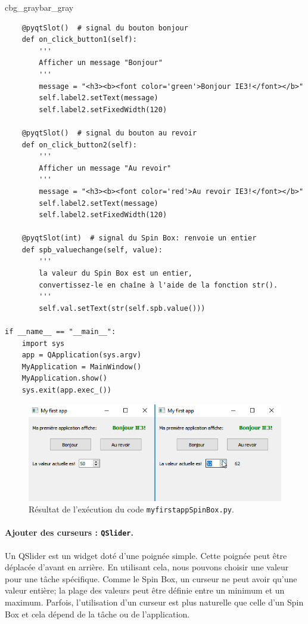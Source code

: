 \documentclass[%
oneside,                 %
final,                   %
10pt,french]{article}
\newenvironment{_pro_tight}[2]{
   \def\FrameCommand{\color{#2}\vrule width 1mm\normalcolor\colorbox{#1}}
   \FrameRule0.6pt\MakeFramed {\advance\hsize-2mm\FrameRestore}\vskip3mm}
   {\vskip0mm\endMakeFramed}
\newenvironment{pro}[2]{
\bgroup\rmfamily
\fboxsep=0mm\relax
\begin{_pro_tight}{#1}{#2}
\list{}{\parsep=-2mm\parskip=0mm\topsep=0pt\leftmargin=2mm
\rightmargin=2\leftmargin\leftmargin=4pt\relax}
\item\relax}
{\endlist\end{_pro_tight}\egroup}
\begin{document}
\begin{pro}{cbg_gray}{bar_gray}
\begin{verbatim}
    @pyqtSlot()  # signal du bouton bonjour
    def on_click_button1(self):
        '''
        Afficher un message "Bonjour"
        '''
        message = "<h3><b><font color='green'>Bonjour IE3!</font></b>"
        self.label2.setText(message)
        self.label2.setFixedWidth(120)

    @pyqtSlot()  # signal du bouton au revoir
    def on_click_button2(self):
        '''
        Afficher un message "Au revoir"
        '''
        message = "<h3><b><font color='red'>Au revoir IE3!</font></b>"
        self.label2.setText(message)
        self.label2.setFixedWidth(120)

    @pyqtSlot(int)  # signal du Spin Box: renvoie un entier
    def spb_valuechange(self, value):
        '''
        la valeur du Spin Box est un entier,
        convertissez-le en chaîne à l'aide de la fonction str().
        '''
        self.val.setText(str(self.spb.value()))

if __name__ == "__main__":
    import sys
    app = QApplication(sys.argv)
    MyApplication = MainWindow()
    MyApplication.show()
    sys.exit(app.exec_())
\end{verbatim}
\end{pro}
\noindent


\begin{figure}[!ht]  %
  \centerline{\includegraphics[width=0.4\linewidth]{imgs/myfirstappSpinBox.png}}
  \caption{
  Résultat de l'exécution du code \texttt{myfirstappSpinBox.py}. \label{fig:myfirstappSpinBox}
  }
\end{figure}


\paragraph{Ajouter des curseurs : \texttt{QSlider}.}
Un QSlider est un widget doté d'une poignée simple. Cette poignée peut être déplacée d'avant en arrière. En utilisant cela, nous pouvons choisir une valeur pour une tâche spécifique. Comme le Spin Box, un curseur ne peut avoir qu'une valeur entière; la plage des valeurs peut être définie entre un minimum et un maximum. Parfois, l’utilisation d’un curseur est plus naturelle que celle d’un Spin Box et cela dépend de la tâche ou de l’application.
\end{document}
